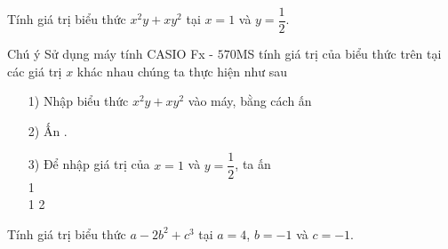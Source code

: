 \begin{vd}%
	Tính giá trị biểu thức $x^2y+xy^2$ tại $x=1$ và $y=\dfrac{1}{2}$.
\end{vd}

\begin{note}{Chú ý}
	Sử dụng máy tính CASIO Fx - $570$MS tính giá trị của biểu thức trên tại các giá trị $x$ khác nhau chúng ta thực hiện như sau
	\begin{itemize}
		\item[1)] Nhập biểu thức $x^2y+xy^2$ vào máy, bằng cách ấn
		\begin{center}
			     \fbox{$+$} \fbox{$+$}      
		\end{center}
		\item[2)] Ấn  .
		\item[3)] Để nhập giá trị của  $x=1$ và $y=\dfrac{1}{2}$, ta ấn \\
				1 \fbox{=}	\qquad \qquad \qquad\qquad \qquad \fbox{Y?\qquad 1}\\
				1  2 \fbox{=}	\qquad \qquad \qquad $~~~$ \fbox{~\qquad $3/4$}\\
	\end{itemize}
	\end{note}

\begin{vd}%
	Tính giá trị biểu thức $a-2b^2+c^3$ tại $a=4$, $b=-1$ và $c=-1$.
\end{vd}

